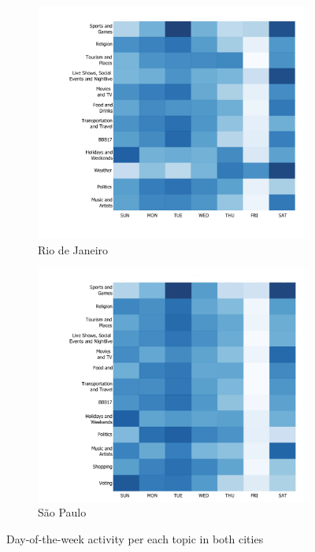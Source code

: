 \begin{figure}[!t]
	\centering
	\begin{subfigure}{0.49\textwidth}
		\centering
		\includegraphics[width=1.0\linewidth]{figures/rio_topics_heatmap.pdf}
		\caption{Rio de Janeiro}
		\label{fig:rio}
	\end{subfigure}
	\begin{subfigure}{0.49\textwidth}
		\centering
		\includegraphics[width=1.0\linewidth]{figures/sp_topics_heatmap.pdf}
		\caption{São Paulo}
		\label{fig:sp}
	\end{subfigure}
	\caption[Day-of-the-week Twitter activity]{Day-of-the-week activity per each topic in both cities}
	\label{fig:topics_heat_maps}
\end{figure}


